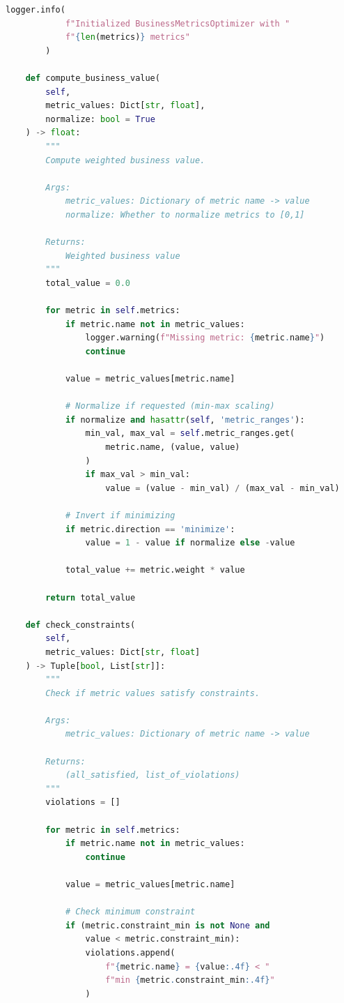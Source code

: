 \begin{lstlisting}[language=Python, caption={Business Metrics Optimization Framework}]
        logger.info(
            f"Initialized BusinessMetricsOptimizer with "
            f"{len(metrics)} metrics"
        )

    def compute_business_value(
        self,
        metric_values: Dict[str, float],
        normalize: bool = True
    ) -> float:
        """
        Compute weighted business value.

        Args:
            metric_values: Dictionary of metric name -> value
            normalize: Whether to normalize metrics to [0,1]

        Returns:
            Weighted business value
        """
        total_value = 0.0

        for metric in self.metrics:
            if metric.name not in metric_values:
                logger.warning(f"Missing metric: {metric.name}")
                continue

            value = metric_values[metric.name]

            # Normalize if requested (min-max scaling)
            if normalize and hasattr(self, 'metric_ranges'):
                min_val, max_val = self.metric_ranges.get(
                    metric.name, (value, value)
                )
                if max_val > min_val:
                    value = (value - min_val) / (max_val - min_val)

            # Invert if minimizing
            if metric.direction == 'minimize':
                value = 1 - value if normalize else -value

            total_value += metric.weight * value

        return total_value

    def check_constraints(
        self,
        metric_values: Dict[str, float]
    ) -> Tuple[bool, List[str]]:
        """
        Check if metric values satisfy constraints.

        Args:
            metric_values: Dictionary of metric name -> value

        Returns:
            (all_satisfied, list_of_violations)
        """
        violations = []

        for metric in self.metrics:
            if metric.name not in metric_values:
                continue

            value = metric_values[metric.name]

            # Check minimum constraint
            if (metric.constraint_min is not None and
                value < metric.constraint_min):
                violations.append(
                    f"{metric.name} = {value:.4f} < "
                    f"min {metric.constraint_min:.4f}"
                )


\end{lstlisting}
